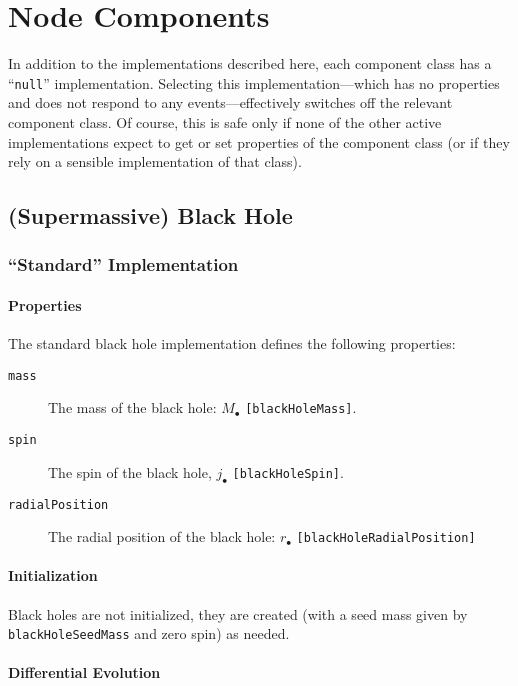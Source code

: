 \chapter{Node Components}\label{sec:Components}

In addition to the implementations described here, each component class has a ``{\tt null}'' implementation. Selecting this implementation---which has no properties and does not respond to any events---effectively switches off the relevant component class. Of course, this is safe only if none of the other active implementations expect to get or set properties of the component class (or if they rely on a sensible implementation of that class).

\section{(Supermassive) Black Hole}

\subsection{``Standard'' Implementation}

\subsubsection{Properties}

The standard black hole implementation defines the following properties:
\begin{description}
 \item [{\tt mass}] The mass of the black hole: $M_\bullet$ {\tt [blackHoleMass]}.
 \item [{\tt spin}] The spin of the black hole, $j_\bullet$ {\tt [blackHoleSpin]}.
 \item [{\tt radialPosition}] The radial position of the black hole: $r_\bullet$ {\tt [blackHoleRadialPosition]} 
\end{description}

\subsubsection{Initialization}

Black holes are not initialized, they are created (with a seed mass given by {\tt blackHoleSeedMass} and zero spin) as needed.

\subsubsection{Differential Evolution}

